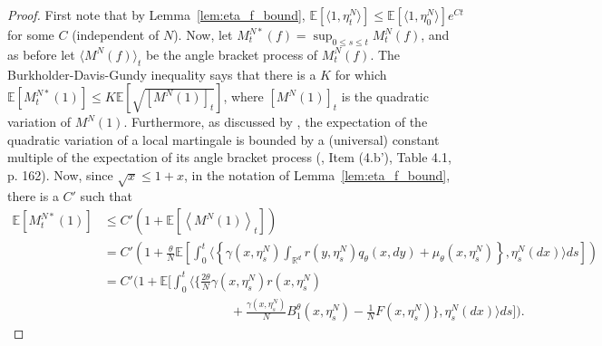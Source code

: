 \documentclass[EJP]{ejpecp} %
\newcommand{\IE}{\mathbb E}
\newcommand{\IR}{\mathbb R}
\newcommand{\citet}[1]{\cite{#1}}
\begin{document}
\begin{proof}
    First note that by Lemma~\ref{lem:eta_f_bound},
    $\IE[\langle 1, \eta^N_t \rangle] \le \IE[\langle 1, \eta^N_0 \rangle] e^{Ct}$
    for some $C$ (independent of $N$).
    Now, let $M^{N*}_t(f) = \sup_{0 \le s \le t} M^N_t(f)$,
    and as before let $\langle M^N(f) \rangle_t$ be the angle bracket process of $M^N_t(f)$.
    The Burkholder-Davis-Gundy inequality says that there is a $K$ for which
    $\IE\left[ M^{N*}_t(1) \right] \le K \IE[\sqrt{[M^N(1)]_t}]$,
    where $[M^N(1)]_t$ is the quadratic variation of $M^N(1)$.
    Furthermore, as discussed by \citet{hernandez/jacka:2022},
    the expectation of the quadratic variation of a local martingale
    is bounded by a (universal) constant multiple of the expectation of its angle bracket process
    (\cite{barlow/jacka/yor:1986}, Item (4.b'), Table 4.1, p. 162).
    Now, since $\sqrt{x} \le 1 + x$,
    in the notation of Lemma~\ref{lem:eta_f_bound}, there is a $C'$ such that
    \begin{align*}
        \IE\left[ M^{N*}_t(1) \right]
        &\le
        C'\left( 1 + \IE\left[ \left\langle M^N(1) \right\rangle_t \right] \right)
        \\ &=
        C'\left( 1 + \frac{\theta}{N} \IE\left[
            \int_0^t
	    \Big\langle\left\{
                \gamma(x, \eta^N_s)
                \int_{\IR^d} r(y, \eta^N_s) q_\theta(x, dy)
                + \mu_\theta(x, \eta^N_s)
            \right\}, \eta_s^N(dx)\Big\rangle
            ds
            \right] \right)
        \\ &=
        C'\Big( 1 + \IE\Big[
            \int_0^t
	    \Big\langle\Big\{
                \frac{2\theta}{N} \gamma(x, \eta^N_s) r(x, \eta^N_s)
        \\ &\qquad\qquad\qquad\qquad \qquad {}
		+ \frac{\gamma(x,\eta_s^N)}{N} 
		B^\theta_1(x, \eta^N_s)-\frac{1}{N}F(x,\eta^N_s)
            \Big\}, \eta_s^N(dx) \Big\rangle
            ds
            \Big] \Big) .
    \end{align*}


\end{proof}
\end{document}
